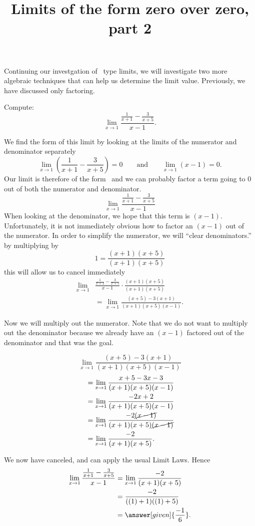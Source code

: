 \documentclass{ximera}
\title{Limits of the form zero over zero, part 2}
\begin{document}
\begin{abstract}
\end{abstract}
\maketitle

Continuing our investgation of  \zeroOverZero\  type limits, we will investigate two more algebraic techniques that can help us determine the limit value. Previously, we have discussed only factoring.

\begin{example}
  Compute:
  \[
  \lim_{x\to 1} \frac{\frac{1}{x+1}-\frac{3}{x+5}}{x-1}.
  \]
\begin{explanation}
  We find the form of this limit by looking at the limits of the
  numerator and denominator separately
  \[
  \lim_{x\to 1}\left(\frac{1}{x+1}-\frac{3}{x+5}\right)=0\qquad\text{and}\qquad\lim_{x\to 1}\left(x-1\right)=0.
  \]
  Our limit is therefore of the form \zeroOverZero\ and we can
  probably factor a term going to $0$ out of both the numerator and
  denominator.
  \[
  \lim_{x\to 1} \frac{\frac{1}{x+1}-\frac{3}{x+5}}{x-1}
  \]
  When looking at the denominator, we hope that this
  term is $(x-1)$.  Unfortunately, it is not immediately obvious how to
  factor an $(x-1)$ out of the numerator.  In order to simplify the
  numerator, we will ``clear denominators.'' by multiplying by
  \[
  1 = \frac{(x+1)(x+5)}{(x+1)(x+5)}
  \]
  this will allow us to cancel immediately
\begin{align*}
  \lim_{x\to 1}& \frac{\frac{1}{x+1}-\frac{3}{x+5}}{x-1}  \cdot \frac{(x+1)(x+5)}{(x+1)(x+5)} \\
  &= \lim_{x\to 1}\frac{(x+5)-3(x+1)}{(x+1)(x+5)(x-1)}.
\end{align*}

Now we will multiply out the numerator.  Note that we do not want to
multiply out the denominator because we already have an $(x-1)$
factored out of the denominator and that was the goal.

\[
\lim_{x\to 1}\frac{(x+5)-3(x+1)}{(x+1)(x+5)(x-1)}
\]
\begin{align*}
  &= \lim_{x\to 1}\frac{x+5-3x-3}{(x+1)(x+5)(x-1)} \\
  &= \lim_{x\to 1}\frac{-2x+2}{(x+1)(x+5)(x-1)}\\
  &= \lim_{x\to 1}\frac{-2\cancel{(x-1)}}{(x+1)(x+5)\cancel{(x-1)}}\\
  &= \lim_{x\to 1}\frac{-2}{(x+1)(x+5)}.
\end{align*}
  
We now have canceled, and can apply the usual Limit Laws.  Hence
\begin{align*}
\lim_{x\to 1} \frac{\frac{1}{x+1}-\frac{3}{x+5}}{x-1}&=\lim_{x\to
  1}\frac{-2}{(x+1)(x+5)}\\
&= \frac{-2}{((1)+1)((1)+5)} \\
&=\answer[given]{\frac{-1}{6}}.
\end{align*}
\end{explanation}
\end{example}
\end{document}
